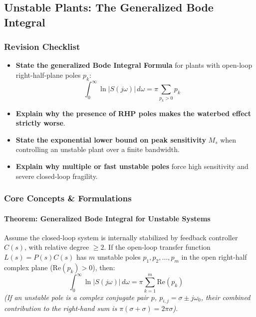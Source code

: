 \documentclass[12pt,onecolumn,twoside ]{article}
\begin{document}
	\subsection{Unstable Plants: The Generalized Bode Integral}
	\subsubsection{Revision Checklist}
	\begin{itemize}
		\item[$\square$]
		\textbf{State the generalized Bode Integral Formula} for plants with open-loop right-half-plane poles $p_k$: \[
		\int_{0}^{\infty} \ln |S(j\omega)|\, d\omega = \pi \sum_{p_k > 0} p_k \quad
		\]
		\item[$\square$]
		\textbf{Explain why the presence of RHP poles makes the waterbed effect strictly worse}.
		\item[$\square$]
		\textbf{State the exponential lower bound on peak sensitivity} $M_s$ when controlling an unstable plant over a finite bandwidth.
		\item[$\square$]
		\textbf{Explain why multiple or fast unstable poles} force high sensitivity and severe closed-loop fragility.
	\end{itemize}
	
	\subsubsection{Core Concepts \& Formulations}
	\paragraph{Theorem: Generalized Bode Integral for Unstable Systems}
	Assume the closed-loop system is internally stabilized by feedback controller $C(s)$, with relative degree $\ge 2$. If the open-loop transfer function $L(s) = P(s)C(s)$ has $m$ unstable poles $p_1, p_2, \dots, p_m$ in the open right-half complex plane ($\text{Re}(p_k) > 0$), then:
	\[
	\int_{0}^{\infty} \ln |S(j\omega)|\, d\omega = \pi \sum_{k=1}^{m} \text{Re}(p_k) \quad
	\]
	\textit{(If an unstable pole is a complex conjugate pair $p$, $p_{i,j} = \sigma \pm j\omega_0$, their combined contribution to the right-hand sum is $\pi(\sigma + \sigma) = 2\pi\sigma$).}
\end{document}

